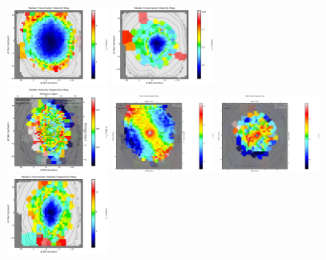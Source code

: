 \begin{figure}
      \includegraphics[width=0.3\textwidth]{chapter4/Vmaps/ic1459_stellar_vel_uncert.png}
      \includegraphics[width=0.3\textwidth]{chapter4/Vmaps/ic1531_stellar_vel_uncert.png}
      \\
      \includegraphics[width=0.3\textwidth]{chapter4/Vmaps/eso443-g024_stellar_sigma.png}
      \includegraphics[width=0.3\textwidth]{chapter4/Vmaps/ic1459_stellar_sigma.png}
      \includegraphics[width=0.3\textwidth]{chapter4/Vmaps/ic1531_stellar_sigma.png}
      \\
      \includegraphics[width=0.3\textwidth]{chapter4/Vmaps/eso443-g024_stellar_sigma_uncert.png}

\end{figure}
